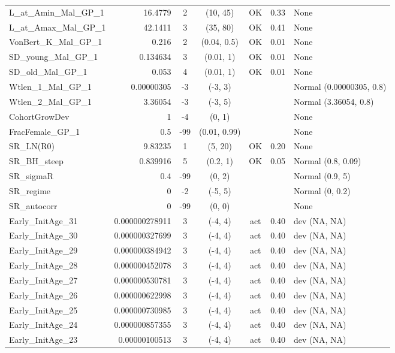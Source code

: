 \documentclass[12pt,]{article}
\begin{document}
\begin{landscape}
\begin{longtable}{lrcccll}
  L\_at\_Amin\_Mal\_GP\_1 & 16.4779 & 2 & (10, 45) & OK & 0.33 & None \\ 
  L\_at\_Amax\_Mal\_GP\_1 & 42.1411 & 3 & (35, 80) & OK & 0.41 & None \\ 
  VonBert\_K\_Mal\_GP\_1 & 0.216 & 2 & (0.04, 0.5) & OK & 0.01 & None \\ 
  SD\_young\_Mal\_GP\_1 & 0.134634 & 3 & (0.01, 1) & OK & 0.01 & None \\ 
  SD\_old\_Mal\_GP\_1 & 0.053 & 4 & (0.01, 1) & OK & 0.01 & None \\ 
  Wtlen\_1\_Mal\_GP\_1 & 0.00000305 & -3 & (-3, 3) &  &  & Normal (0.00000305, 0.8) \\ 
  Wtlen\_2\_Mal\_GP\_1 & 3.36054 & -3 & (-3, 5) &  &  & Normal (3.36054, 0.8) \\ 
  CohortGrowDev & 1 & -4 & (0, 1) &  &  & None \\ 
  FracFemale\_GP\_1 & 0.5 & -99 & (0.01, 0.99) &  &  & None \\ 
  SR\_LN(R0) & 9.83235 & 1 & (5, 20) & OK & 0.20 & None \\ 
  SR\_BH\_steep & 0.839916 & 5 & (0.2, 1) & OK & 0.05 & Normal (0.8, 0.09) \\ 
  SR\_sigmaR & 0.4 & -99 & (0, 2) &  &  & Normal (0.9, 5) \\ 
  SR\_regime & 0 & -2 & (-5, 5) &  &  & Normal (0, 0.2) \\ 
  SR\_autocorr & 0 & -99 & (0, 0) &  &  & None \\ 
  Early\_InitAge\_31 & 0.000000278911 & 3 & (-4, 4) & act & 0.40 & dev (NA, NA) \\ 
  Early\_InitAge\_30 & 0.000000327699 & 3 & (-4, 4) & act & 0.40 & dev (NA, NA) \\ 
  Early\_InitAge\_29 & 0.000000384942 & 3 & (-4, 4) & act & 0.40 & dev (NA, NA) \\ 
  Early\_InitAge\_28 & 0.000000452078 & 3 & (-4, 4) & act & 0.40 & dev (NA, NA) \\ 
  Early\_InitAge\_27 & 0.000000530781 & 3 & (-4, 4) & act & 0.40 & dev (NA, NA) \\ 
  Early\_InitAge\_26 & 0.000000622998 & 3 & (-4, 4) & act & 0.40 & dev (NA, NA) \\ 
  Early\_InitAge\_25 & 0.000000730985 & 3 & (-4, 4) & act & 0.40 & dev (NA, NA) \\ 
  Early\_InitAge\_24 & 0.000000857355 & 3 & (-4, 4) & act & 0.40 & dev (NA, NA) \\ 
  Early\_InitAge\_23 & 0.00000100513 & 3 & (-4, 4) & act & 0.40 & dev (NA, NA) \\ 

\end{longtable}
\end{landscape}
\end{document}
